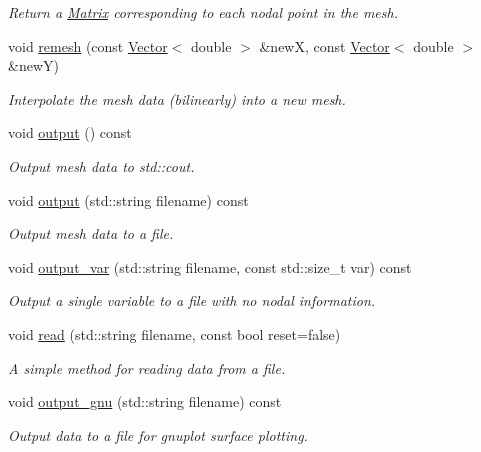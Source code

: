 \begin{DoxyCompactItemize}
\begin{DoxyCompactList}\small\item\em Return a \hyperlink{classLuna_1_1Matrix}{Matrix} corresponding to each nodal point in the mesh. \end{DoxyCompactList}\item 
void \hyperlink{classLuna_1_1Mesh2D_a3874356b327d21ac65b16d181a4240f3}{remesh} (const \hyperlink{classLuna_1_1Vector}{Vector}$<$ double $>$ \&newX, const \hyperlink{classLuna_1_1Vector}{Vector}$<$ double $>$ \&newY)
\begin{DoxyCompactList}\small\item\em Interpolate the mesh data (bilinearly) into a new mesh. \end{DoxyCompactList}\item 
void \hyperlink{classLuna_1_1Mesh2D_a904628aa8c8e0b4ca4a0d794f52c8899}{output} () const
\begin{DoxyCompactList}\small\item\em Output mesh data to std\+::cout. \end{DoxyCompactList}\item 
void \hyperlink{classLuna_1_1Mesh2D_a02037bbd93a09db9c772528c4a4e8bf3}{output} (std\+::string filename) const
\begin{DoxyCompactList}\small\item\em Output mesh data to a file. \end{DoxyCompactList}\item 
void \hyperlink{classLuna_1_1Mesh2D_ab5fe26bc77435039388362aeab903313}{output\+\_\+var} (std\+::string filename, const std\+::size\+\_\+t var) const
\begin{DoxyCompactList}\small\item\em Output a single variable to a file with no nodal information. \end{DoxyCompactList}\item 
void \hyperlink{classLuna_1_1Mesh2D_a21825e991e96d5cfad2dc9de68cf5f73}{read} (std\+::string filename, const bool reset=false)
\begin{DoxyCompactList}\small\item\em A simple method for reading data from a file. \end{DoxyCompactList}\item 
void \hyperlink{classLuna_1_1Mesh2D_a8fc9046e860764d5069c4e9b8667df1f}{output\+\_\+gnu} (std\+::string filename) const
\begin{DoxyCompactList}\small\item\em Output data to a file for gnuplot surface plotting. \end{DoxyCompactList}\item 

\end{DoxyCompactItemize}
